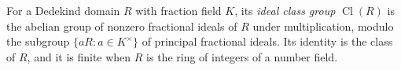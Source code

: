 
For a Dedekind domain $R$ with fraction field $K$, its \emph{ideal class group} $\operatorname{Cl}(R)$ is the abelian group of nonzero fractional ideals of $R$ under multiplication, modulo the subgroup $\{aR:a\in K^\times\}$ of principal fractional ideals. Its identity is the class of $R$, and it is finite when $R$ is the ring of integers of a number field.
